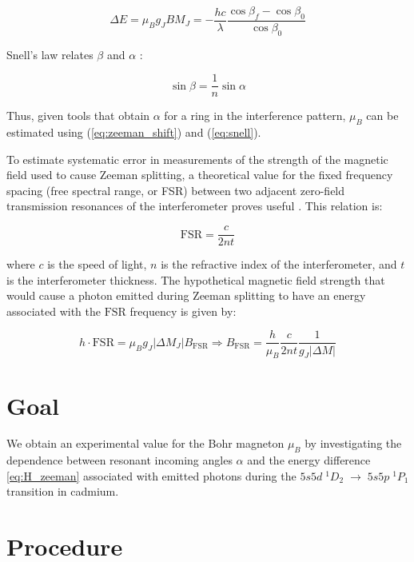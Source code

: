 \documentclass[11pt]{article}
\begin{document}
\begin{equation}
  \Delta E = \mu_B g_J B M_J = -\frac{hc}{\lambda} \frac{\cos \beta_f - \cos \beta_0}{\cos \beta_0}
  \label{eq:zeeman_shift}
\end{equation}

Snell's law relates $\beta$ and $\alpha$ \cite{young}:

\begin{equation}
  \sin \beta = \frac{1}{n} \sin \alpha
  \label{eq:snell}
\end{equation}

Thus, given tools that obtain $\alpha$ for a ring in the interference pattern, $\mu_B$ can be estimated using (\ref{eq:zeeman_shift}) and (\ref{eq:snell}).

To estimate systematic error in measurements of the strength of the magnetic field used to cause Zeeman splitting, a theoretical value for the fixed frequency spacing (free spectral range, or FSR) between two adjacent zero-field transmission resonances of the interferometer proves useful \cite{leybold}. This relation is:

\begin{equation}
  \text{FSR} = \frac{c}{2nt}
\end{equation}

where $c$ is the speed of light, $n$ is the refractive index of the interferometer, and $t$ is the interferometer thickness. The hypothetical magnetic field strength that would cause a photon emitted during Zeeman splitting to have an energy associated with the $\text{FSR}$ frequency is given by:

\begin{equation}
  h \cdot \text{FSR} = \mu_B g_J |\Delta M_J| B_{\text{FSR}} 
  \Rightarrow
  B_{\text{FSR}} =  \frac{h}{\mu_B} \frac{c}{2nt} \frac{1}{g_J |\Delta M|}
  \label{eq:hFSR}
\end{equation}

\section{Goal}

We obtain an experimental value for the Bohr magneton $\mu_B$ by investigating the dependence between resonant incoming angles $\alpha$ and the energy difference \eqref{eq:H_zeeman} associated with emitted photons during the $5s5d\;{}^{1}D_{2} \;\longrightarrow\;5s5p\;{}^{1}P_{1}$ transition in cadmium. 

\section{Procedure}
\end{document}
